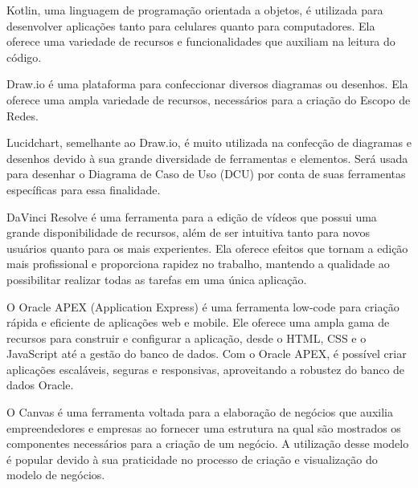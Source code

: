 Kotlin, uma linguagem de programação orientada a objetos, é utilizada para desenvolver aplicações tanto para celulares quanto para computadores. Ela oferece uma variedade de recursos e funcionalidades que auxiliam na leitura do código.

Draw.io é uma plataforma para confeccionar diversos diagramas ou desenhos. Ela oferece uma ampla variedade de recursos, necessários para a criação do Escopo de Redes.

Lucidchart, semelhante ao Draw.io, é muito utilizada na confecção de diagramas e desenhos devido à sua grande diversidade de ferramentas e elementos. Será usada para desenhar o Diagrama de Caso de Uso (DCU) por conta de suas ferramentas específicas para essa finalidade.

DaVinci Resolve é uma ferramenta para a edição de vídeos que possui uma grande disponibilidade de recursos, além de ser intuitiva tanto para novos usuários quanto para os mais experientes. Ela oferece efeitos que tornam a edição mais profissional e proporciona rapidez no trabalho, mantendo a qualidade ao possibilitar realizar todas as tarefas em uma única aplicação.

O Oracle APEX (Application Express) é uma ferramenta low-code para criação rápida e eficiente de aplicações web e mobile. Ele oferece uma ampla gama de recursos para construir e configurar a aplicação, desde o HTML, CSS e o JavaScript até a gestão do banco de dados. Com o Oracle APEX, é possível criar aplicações escaláveis, seguras e responsivas, aproveitando a robustez do banco de dados Oracle.

O Canvas é uma ferramenta voltada para a elaboração de negócios que auxilia empreendedores e empresas ao fornecer uma estrutura na qual são mostrados os componentes necessários para a criação de um negócio. A utilização desse modelo é popular devido à sua praticidade no processo de criação e visualização do modelo de negócios.